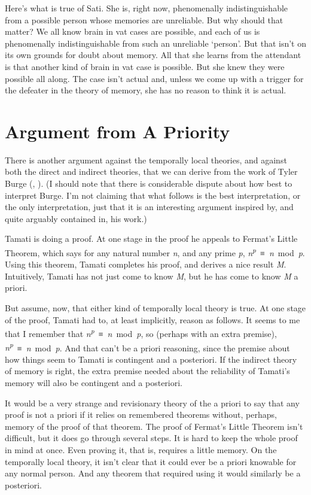 \documentclass[
  11pt,
  letterpaper,
  DIV=11,
  numbers=noendperiod,
  twoside]{scrartcl}
\begin{document}
Here's what is true of Sati. She is, right now, phenomenally
indistinguishable from a possible person whose memories are unreliable.
But why should that matter? We all know brain in vat cases are possible,
and each of us is phenomenally indistinguishable from such an unreliable
`person'. But that isn't on its own grounds for doubt about memory. All
that she learns from the attendant is that another kind of brain in vat
case is possible. But she knew they were possible all along. The case
isn't actual and, unless we come up with a trigger for the defeater in
the theory of memory, she has no reason to think it is actual.

\section{Argument from A Priority}\label{argumentfromapriority}

There is another argument against the temporally local theories, and
against both the direct and indirect theories, that we can derive from
the work of Tyler Burge (,
). (I should note that there is
considerable dispute about how best to interpret Burge. I'm not claiming
that what follows is the best interpretation, or the only
interpretation, just that it is an interesting argument inspired by, and
quite arguably contained in, his work.)

Tamati is doing a proof. At one stage in the proof he appeals to
Fermat's Little Theorem, which says for any natural number \emph{n}, and
any prime \emph{p}, \emph{n\textsuperscript{p}}~≡~\emph{n}~mod~\emph{p}.
Using this theorem, Tamati completes his proof, and derives a nice
result \emph{M}. Intuitively, Tamati has not just come to know \emph{M},
but he has come to know \emph{M} a priori.

But assume, now, that either kind of temporally local theory is true. At
one stage of the proof, Tamati had to, at least implicitly, reason as
follows. It seems to me that I remember that
\emph{n\textsuperscript{p}}~≡~\emph{n}~mod~\emph{p}, so (perhaps with an
extra premise), \emph{n\textsuperscript{p}}~≡~\emph{n}~mod~\emph{p}. And
that can't be a priori reasoning, since the premise about how things
seem to Tamati is contingent and a posteriori. If the indirect theory of
memory is right, the extra premise needed about the reliability of
Tamati's memory will also be contingent and a posteriori.

It would be a very strange and revisionary theory of the a priori to say
that any proof is not a priori if it relies on remembered theorems
without, perhaps, memory of the proof of that theorem. The proof of
Fermat's Little Theorem isn't difficult, but it does go through several
steps. It is hard to keep the whole proof in mind at once. Even proving
it, that is, requires a little memory. On the temporally local theory,
it isn't clear that it could ever be a priori knowable for any normal
person. And any theorem that required using it would similarly be a
posteriori.
\end{document}
